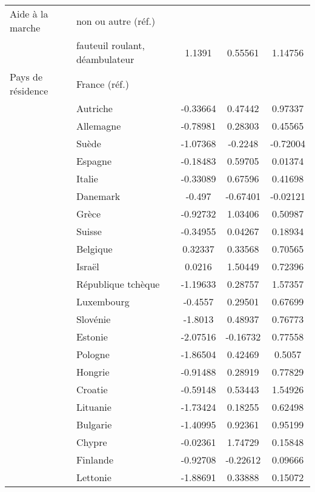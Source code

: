 \begin{Article}
\begin{refsection}[Bonnal]
\begin{table}
{\begin{tabular}{l@{\;}l@{\;} S!{\qquad}S!{\qquad}S!{\qquad}}
	Aide à la marche & non ou autre (réf.) &\sym{}&  \sym{}&\sym{} \\
	& fauteuil roulant, déambulateur & 1.1391\sym{***} & 0.55561\sym{***} & 1.14756\sym{***} \\\hline
	Pays de résidence & France (réf.) &\sym{}&  \sym{}&\sym{} \\
	& Autriche & -0.33664\sym{**} & 0.47442\sym{***} & 0.97337\sym{***} \\
	& Allemagne & -0.78981\sym{***} & 0.28303\sym{*} & 0.45565\sym{*} \\
	& Suède & -1.07368\sym{***} & -0.2248 & -0.72004\sym{**} \\
	& Espagne & -0.18483 & 0.59705\sym{***} & 0.01374 \\
	& Italie & -0.33089\sym{**} & 0.67596\sym{***} & 0.41698 \\
	& Danemark & -0.497\sym{***} & -0.67401\sym{***} & -0.02121 \\
	& Grèce & -0.92732\sym{***} & 1.03406\sym{***} & 0.50987\sym{**} \\
	& Suisse & -0.34955\sym{***} & 0.04267 & 0.18934 \\
	& Belgique & 0.32337\sym{***} & 0.33568\sym{***} & 0.70565\sym{***} \\
	& Israël & 0.0216 & 1.50449\sym{***} & 0.72396\sym{*} \\
	& République tchèque & -1.19633\sym{***} & 0.28757 & 1.57357\sym{***} \\
	& Luxembourg & -0.4557\sym{**} & 0.29501 & 0.67699\sym{*} \\
	& Slovénie & -1.8013\sym{***} & 0.48937\sym{**} & 0.76773\sym{***} \\
	& Estonie & -2.07516\sym{***} & -0.16732 & 0.77558\sym{***} \\
	& Pologne & -1.86504\sym{***} & 0.42469 & 0.5057\sym{*} \\
	& Hongrie & -0.91488\sym{***} & 0.28919 & 0.77829\sym{**} \\
	& Croatie & -0.59148\sym{**} & 0.53443\sym{*} & 1.54926\sym{***} \\
	& Lituanie & -1.73424\sym{***} & 0.18255 & 0.62498\sym{**} \\
	& Bulgarie & -1.40995\sym{***} & 0.92361\sym{**} & 0.95199\sym{***} \\
	& Chypre & -0.02361 & 1.74729\sym{***} & 0.15848 \\
	& Finlande & -0.92708\sym{***} & -0.22612 & 0.09666 \\
	& Lettonie & -1.88691\sym{***} & 0.33888 & 0.15072 \\

\end{tabular}}
\end{table}
\end{refsection}
\end{Article}
